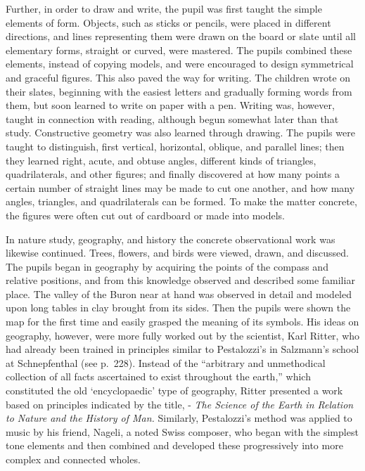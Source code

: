 \documentclass[
]{book}
\begin{document}
Further, in order to draw and write, the pupil was first taught the simple elements of form. Objects, such as sticks or pencils, were placed in different directions, and lines representing them were drawn on the board or slate until all elementary forms, straight or curved, were mastered. The pupils combined these elements, instead of copying models, and were encouraged to design symmetrical and graceful figures. This also paved the way for writing. The children wrote on their slates, beginning with the easiest letters and gradually forming words from them, but soon learned to write on paper with a pen. Writing was, however, taught in connection with reading, although begun somewhat later than that study. Constructive geometry was also learned through drawing. The pupils were taught to distinguish, first vertical, horizontal, oblique, and parallel lines; then they learned right, acute, and obtuse angles, different kinds of triangles, quadrilaterals, and other figures; and finally discovered at how many points a certain number of straight lines may be made to cut one another, and how many angles, triangles, and quadrilaterals can be formed. To make the matter concrete, the figures were often cut out of cardboard or made into models.

In nature study, geography, and history the concrete observational work was likewise continued. Trees, flowers, and birds were viewed, drawn, and discussed. The pupils began in geography by acquiring the points of the compass and relative positions, and from this knowledge observed and described some familiar place. The valley of the Buron near at hand was observed in detail and modeled upon long tables in clay brought from its sides. Then the pupils were shown the map for the first time and easily grasped the meaning of its symbols. His ideas on geography, however, were more fully worked out by the scientist, Karl Ritter, who had already been trained in principles similar to Pestalozzi's in Salzmann's school at Schnepfenthal (see p.~228). Instead of the ``arbitrary and unmethodical collection of all facts ascertained to exist throughout the earth,'' which constituted the old `encyclopaedic' type of geography, Ritter presented a work based on principles indicated by the title, - \emph{The Science of the Earth in Relation to Nature and the History of Man.} Similarly, Pestalozzi's method was applied to music by his friend, Nageli, a noted Swiss composer, who began with the simplest tone elements and then combined and developed these progressively into more complex and connected wholes.
\end{document}
